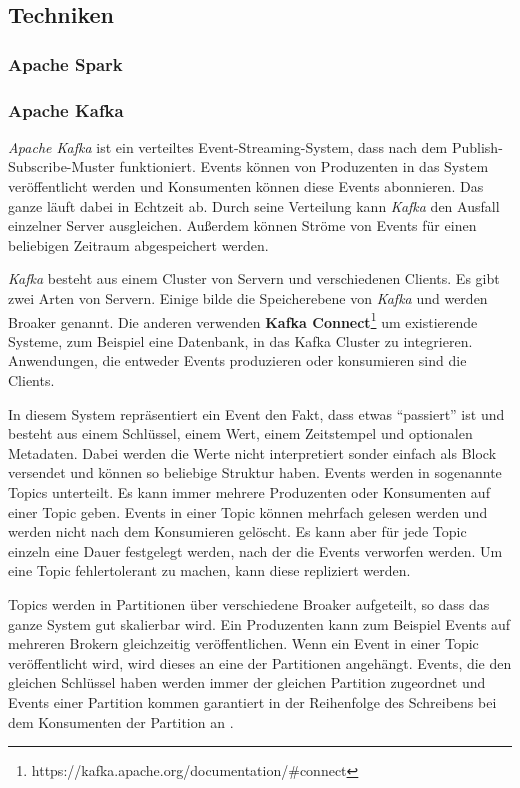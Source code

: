 \subsection{Techniken}

\subsubsection{Apache Spark}

\subsubsection{Apache Kafka}

\textit{Apache Kafka} ist ein verteiltes Event-Streaming-System, dass nach dem Publish-Subscribe-Muster funktioniert.
Events können von Produzenten in das System veröffentlicht werden und Konsumenten können diese Events abonnieren.
Das ganze läuft dabei in Echtzeit ab.
Durch seine Verteilung kann \textit{Kafka} den Ausfall einzelner Server ausgleichen.
Außerdem können Ströme von Events für einen beliebigen Zeitraum abgespeichert werden.

\textit{Kafka} besteht aus einem Cluster von Servern und verschiedenen Clients.
Es gibt zwei Arten von Servern.
Einige bilde die Speicherebene von \textit{Kafka} und werden Broaker genannt.
Die anderen verwenden \textbf{Kafka Connect}\footnote{https://kafka.apache.org/documentation/\#connect} um existierende Systeme, zum Beispiel eine Datenbank, in das Kafka Cluster zu integrieren.
Anwendungen, die entweder Events produzieren oder konsumieren sind die Clients.

In diesem System repräsentiert ein Event den Fakt, dass etwas "`passiert"' ist und besteht aus einem Schlüssel, einem Wert, einem Zeitstempel und optionalen Metadaten.
Dabei werden die Werte nicht interpretiert sonder einfach als Block versendet und können so beliebige Struktur haben.
Events werden in sogenannte Topics unterteilt.
Es kann immer mehrere Produzenten oder Konsumenten auf einer Topic geben.
Events in einer Topic können mehrfach gelesen werden und werden nicht nach dem Konsumieren gelöscht.
Es kann aber für jede Topic einzeln eine Dauer festgelegt werden, nach der die Events verworfen werden.
Um eine Topic fehlertolerant zu machen, kann diese repliziert werden.

Topics werden in Partitionen über verschiedene Broaker aufgeteilt, so dass das ganze System gut skalierbar wird.
Ein Produzenten kann zum Beispiel Events auf mehreren Brokern gleichzeitig veröffentlichen.
Wenn ein Event in einer Topic veröffentlicht wird, wird dieses an eine der Partitionen angehängt.
Events, die den gleichen Schlüssel haben werden immer der gleichen Partition zugeordnet und Events einer Partition kommen garantiert in der Reihenfolge des Schreibens bei dem Konsumenten der Partition an \parencite{kafka-docs}.

